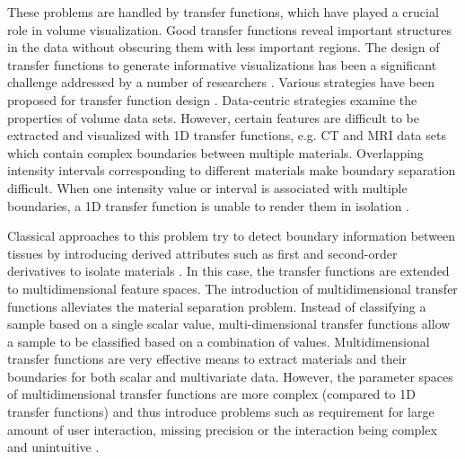 These problems are handled by transfer functions, which have played a crucial role in volume visualization.
Good transfer functions reveal important structures in the data without obscuring them with less important regions.
The design of transfer functions to generate informative visualizations has been a significant challenge addressed by a number of researchers \cite{pfister_transfer_2001}.
Various strategies have been proposed for transfer function design \cite{hadwiger_real-time_2006}.
Data-centric strategies examine the properties of volume data sets.
However, certain features are difficult to be extracted and visualized with 1D transfer functions, e.g. CT and MRI data sets which contain complex boundaries between multiple materials.
Overlapping intensity intervals corresponding to different materials make boundary separation difficult.
When one intensity value or interval is associated with multiple boundaries, a 1D transfer function is unable to render them in isolation \cite{kniss_multidimensional_2002}.

Classical approaches to this problem try to detect boundary information between tissues by introducing derived attributes such as first and second-order derivatives to isolate materials \cite{kindlmann_semi-automatic_1998} \cite{kniss_multidimensional_2002}. In this case, the transfer functions are extended to multidimensional feature spaces. 
The introduction of multidimensional transfer functions alleviates the material separation problem.
Instead of classifying a sample based on a single scalar value, multi-dimensional transfer functions allow a sample to be classified based on a combination of values.
Multidimensional transfer functions are very effective means to extract materials and their boundaries for both scalar and multivariate data. However, the parameter spaces of multidimensional transfer functions are more complex (compared to 1D transfer functions) and thus introduce problems such as requirement for large amount of user interaction, missing precision or the interaction being complex and unintuitive \cite{arens_survey_2010}.

